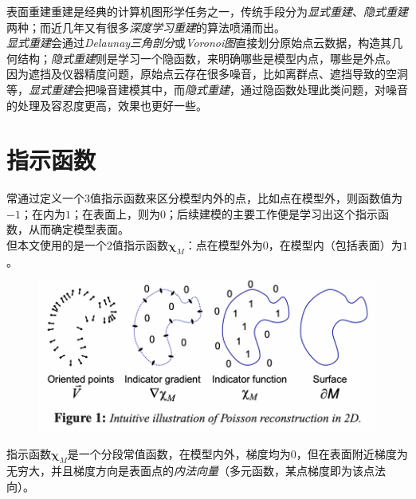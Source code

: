 表面重建重建是经典的计算机图形学任务之一，传统手段分为\textit{显式重建}、\textit{隐式重建}两种；而近几年又有很多\textit{深度学习重建}的算法喷涌而出。\\

\textit{显式重建}会通过\textit{Delaunay三角剖分}或\textit{Voronoi图}直接划分原始点云数据，构造其几何结构；\textit{隐式重建}则是学习一个隐函数，来明确哪些是模型内点，哪些是外点。\\

因为遮挡及仪器精度问题，原始点云存在很多噪音，比如离群点、遮挡导致的空洞等，\textit{显式重建}会把噪音建模其中，而\textit{隐式重建}，通过隐函数处理此类问题，对噪音的处理及容忍度更高，效果也更好一些。\\

\section{指示函数}
常通过定义一个$3$值指示函数来区分模型内外的点，比如点在模型外，则函数值为$-1$；在内为$1$；在表面上，则为$0$；后续建模的主要工作便是学习出这个指示函数，从而确定模型表面。\\

但本文使用的是一个$2$值指示函数$\mathbf{\chi}_M$：点在模型外为$0$，在模型内（包括表面）为$1$。
\begin{figure}[H]
		\begin{center}
			\includegraphics[scale=0.8]{images/p1.png}
		\end{center}
\end{figure}

指示函数$\mathbf{\chi}_M$是一个分段常值函数，在模型内外，梯度均为$0$，但在表面附近梯度为无穷大，并且梯度方向是表面点的\textit{内法向量}（多元函数，某点梯度即为该点法向）。\\


